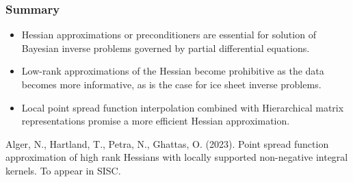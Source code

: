 \documentclass[10pt,final,xcolor=dvipsnames]{beamer}
\begin{document}





\begin{frame}
  \frametitle{Summary}

  \begin{itemize}
  	\setlength\itemsep{1.5em}
  \item Hessian approximations or preconditioners are essential for solution of Bayesian inverse problems governed by
    partial differential equations.
    \vspace{0.05in}
  \item Low-rank approximations of the Hessian become
    prohibitive as the data becomes more informative, as is the case
    for ice sheet inverse problems.
    \vspace{0.05in}
  \item Local point spread function interpolation combined with Hierarchical matrix representations promise a more efficient
    Hessian approximation.
  \end{itemize}
	\vspace{2em}
	{\small Alger, N., Hartland, T., Petra, N., Ghattas, O. (2023). Point spread function approximation of high rank Hessians with locally supported non-negative integral kernels. To appear in SISC.}
\end{frame}
\end{document}
